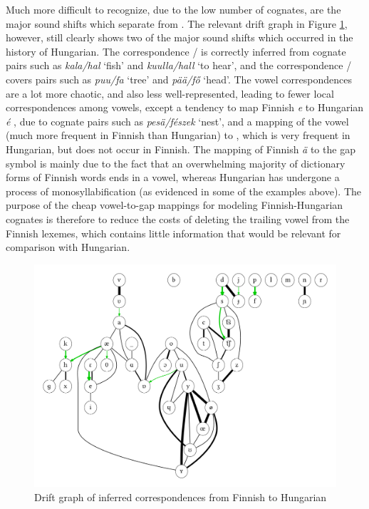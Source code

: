 Much more difficult to recognize, due to the low number of cognates, are the major sound shifts which separate  from . The relevant drift graph in Figure \ref{fig:driftGraphFiHu}, however, still clearly shows two of the major sound shifts which occurred in the history of Hungarian. The correspondence \ipa{[k]}/\ipa{[h]} is correctly inferred from cognate pairs such as \textit{kala/hal} `fish' and \textit{kuulla/hall} `to hear', and the correspondence \ipa{[p]}/\ipa{[f]} covers pairs such as \textit{puu/fa} `tree' and \textit{p\"a\"a/f\H{o}} `head'. The vowel correspondences are a lot more chaotic, and also less well-represented, leading to fewer local correspondences among vowels, except a tendency to map Finnish \textit{e} \ipa{[E]} to Hungarian \textit{\'e} \ipa{[e]}, due to cognate pairs such as \textit{pes\"a/f\'eszek} `nest', and a mapping of the vowel \ipa{[u]} (much more frequent in Finnish than Hungarian) to \ipa{[6]}, which is very frequent in Hungarian, but does not occur 
in Finnish. The mapping of Finnish \textit{\"a} \ipa{[\ae]} to the gap symbol is mainly due to the fact that an overwhelming majority of dictionary forms of Finnish words ends in a vowel, whereas Hungarian has undergone a process of monosyllabification (as evidenced in some of the examples above). The purpose of the cheap vowel-to-gap mappings for modeling Finnish-Hungarian cognates is therefore to reduce the costs of deleting the trailing vowel from the Finnish lexemes, which contains little information that would be relevant for comparison with Hungarian.

\begin{figure}
    \includegraphics[width=\textwidth]{figures/drift-graph-fi-hu.pdf}
    \caption{Drift graph of inferred correspondences from Finnish to Hungarian}
    \label{fig:driftGraphFiHu}
\end{figure}

